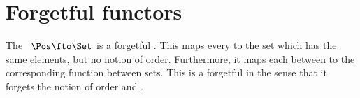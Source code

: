 \section{Forgetful functors}


\begin{example}
    The ~$\Pos \fto \Set$ is a forgetful .
    This  maps every  to the set which has the same elements, but no notion of order.
    Furthermore, it maps each  between  to the corresponding function between sets.
    This is a forgetful  in the sense that it forgets the notion of order and .
\end{example}
